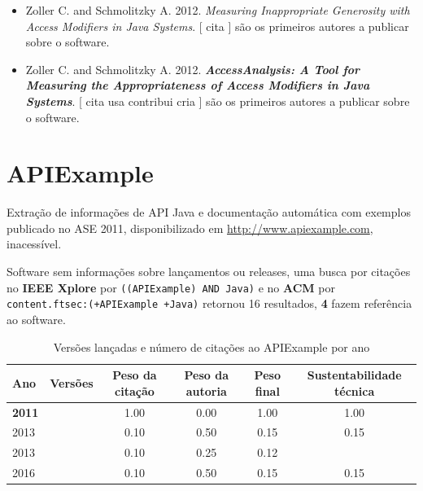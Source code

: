 \begin{itemize}
\item Zoller C. and Schmolitzky A.
      2012.
        \textit{ Measuring Inappropriate Generosity with Access Modifiers in Java Systems}.
      [
          cita
      ]
são os primeiros autores a publicar sobre o software.
\item Zoller C. and Schmolitzky A.
      2012.
        \textbf{\textit{ AccessAnalysis: A Tool for Measuring the Appropriateness of Access Modifiers in Java Systems}}.
      [
          cita
          usa
          contribui
          cria
      ]
são os primeiros autores a publicar sobre o software.
\end{itemize}
\section{APIExample}

Extração de informações de API Java e documentação automática com exemplos
publicado no ASE 2011,
disponibilizado em \url{http://www.apiexample.com},
inacessível.

Software sem informações sobre lançamentos ou releases,
uma busca por citações no {\bf IEEE Xplore} por
\texttt{((APIExample) AND Java)}
e no {\bf ACM} por
\texttt{content.ftsec:(+APIExample +Java)}
retornou
16 resultados,
{\bf 4} fazem referência ao software.


\begin{table}[H]
\caption{Versões lançadas e número de citações ao APIExample por ano}
\centering
\begin{tabular}{| l | c | c | c | c | c |}
  \hline
  Ano & Versões & Peso da citação & Peso da autoria & Peso final & Sustentabilidade técnica \\
  \hline
            {\bf 2011}
          &
          
          &
          1.00
          &
          0.00
          &
          1.00
          &
            {\color{blue} 1.00}
          \\
\hline
            2013
          &
          
          &
          0.10
          &
          0.50
          &
          0.15
          &
            {\color{red} 0.15}
          \\
            2013
          &
          
          &
          0.10
          &
          0.25
          &
          0.12
          &
          \\
\hline
            2016
          &
          
          &
          0.10
          &
          0.50
          &
          0.15
          &
            {\color{red} 0.15}
          \\
\hline
\end{tabular}
\end{table}

